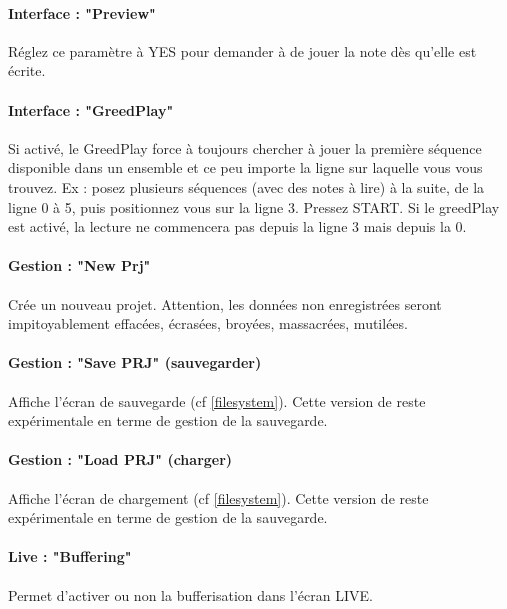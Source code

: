 \documentclass[12pt,a4paper]{article}
\begin{document}
    \paragraph{Interface : "Preview"} Réglez ce paramètre à YES pour demander à \FAT de jouer la note dès qu'elle est écrite.

    \paragraph{Interface : "GreedPlay"} Si activé, le GreedPlay force \FAT à toujours chercher à jouer la première séquence
                                        disponible dans un ensemble et ce peu importe la ligne sur laquelle vous vous trouvez.
                                        Ex : posez plusieurs séquences (avec des notes à lire) à la suite, de la ligne 0 à 5, puis positionnez vous sur la ligne 3.
                                        Pressez START. Si le greedPlay est activé, la lecture ne commencera pas depuis la ligne 3 mais depuis la 0.

    \paragraph{Gestion : "New Prj"} Crée un nouveau projet.
                                    Attention, les données non enregistrées seront impitoyablement effacées, écrasées, broyées, massacrées, mutilées.

    \paragraph{Gestion : "Save PRJ" (sauvegarder)}  Affiche l'écran de sauvegarde (cf \ref{filesystem}).
                                                    Cette version de \FAT reste expérimentale en terme de gestion de la sauvegarde.

    \paragraph{Gestion : "Load PRJ" (charger)} Affiche l'écran de chargement (cf \ref{filesystem}).
                                Cette version de \FAT reste expérimentale en terme de gestion de la sauvegarde.

    \paragraph{Live : "Buffering"}
    Permet d'activer ou non la bufferisation dans l'écran LIVE.
    \medskip
\end{document}
